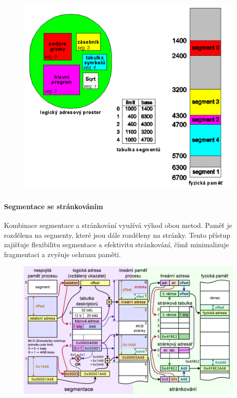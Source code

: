 \begin{figure}[h]
    \centering
    \includegraphics[scale=0.3]{sections/8_riz_op_pam/images/Screenshot 2024-08-26 130622.png}

\end{figure}

\paragraph{Segmentace se stránkováním}
Kombinace segmentace a stránkování využívá výhod obou metod. Paměť je rozdělena na segmenty, které jsou dále rozděleny na stránky. Tento přístup zajišťuje flexibilitu segmentace a efektivitu stránkování, čímž minimalizuje fragmentaci a zvyšuje ochranu paměti.

\begin{figure}[h]
    \centering
    \includegraphics[scale=0.3]{sections/8_riz_op_pam/images/Screenshot 2024-08-26 130536.png}
\end{figure}

